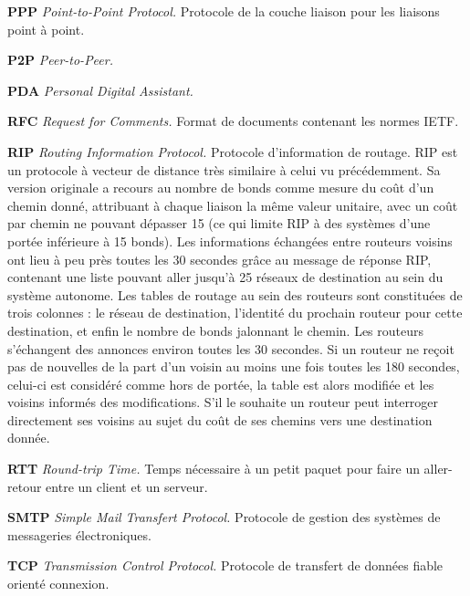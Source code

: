 \textbf{PPP} \textit{Point-to-Point Protocol.} Protocole de la couche liaison pour les liaisons point à point.



\textbf{P2P} \textit{Peer-to-Peer.}



\textbf{PDA} \textit{Personal Digital Assistant.}



\textbf{RFC} \textit{Request for Comments.} Format de documents contenant les normes IETF.



\textbf{RIP} \textit{Routing Information Protocol.} Protocole d’information de routage.
RIP est un protocole à vecteur de distance très similaire à celui vu précédemment.
Sa version originale a recours au nombre de bonds comme mesure du coût d’un chemin
donné, attribuant à chaque liaison la même valeur unitaire, avec un coût par chemin
ne pouvant dépasser 15 (ce qui limite RIP à des systèmes d’une portée inférieure à 15
bonds). Les informations échangées entre routeurs voisins ont lieu à peu près toutes les
30 secondes grâce au message de réponse RIP, contenant une liste pouvant aller jusqu’à
25 réseaux de destination au sein du système autonome.
Les tables de routage au sein des routeurs sont constituées de trois colonnes : le réseau
de destination, l’identité du prochain routeur pour cette destination, et enfin le nombre
de bonds jalonnant le chemin.
Les routeurs s’échangent des annonces environ toutes les 30 secondes. Si un routeur ne
reçoit pas de nouvelles de la part d’un voisin au moins une fois toutes les 180 secondes,
celui-ci est considéré comme hors de portée, la table est alors modifiée et les voisins
informés des modifications.
S’il le souhaite un routeur peut interroger directement ses voisins au sujet du coût de
ses chemins vers une destination donnée.



\textbf{RTT} \textit{Round-trip Time.} Temps nécessaire à un petit paquet pour faire un aller-retour entre un client et un serveur.



\textbf{SMTP} \textit{Simple Mail Transfert Protocol.} Protocole de gestion des systèmes de messageries électroniques.



\textbf{TCP} \textit{Transmission Control Protocol.} Protocole de transfert de données fiable orienté connexion.



